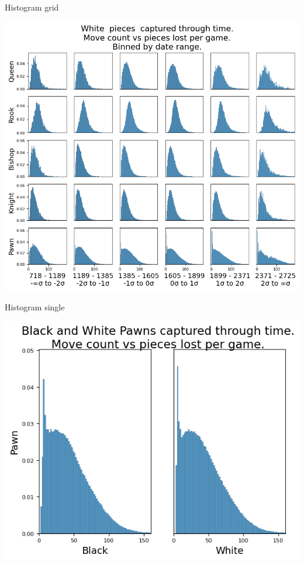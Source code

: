 \documentclass[presentation, 8pt]{beamer}
\begin{document}
\begin{frame}[label={sec:org12eb09a}]{Histogram grid}
\begin{center}
\includegraphics[width=.9\linewidth]{Images/_HIST_Queen_Rook_Bishop_Knight_Pawn_WHITE_ELO_FISC.png}
\end{center}
\end{frame}
\begin{frame}[label={sec:orgc382499}]{Histogram single}
\begin{center}
\includegraphics[width=.9\linewidth]{Images/_HIST_Pawn_FISC.png}
\end{center}
\end{frame}
\end{document}
